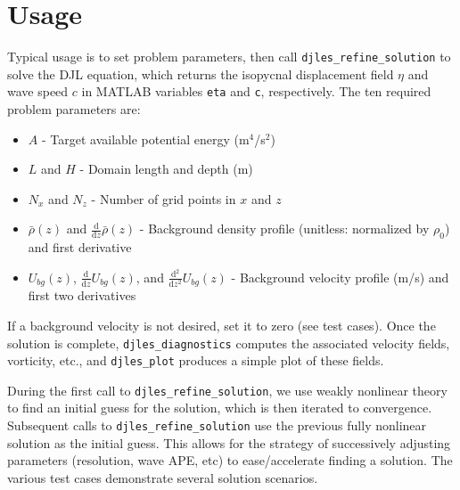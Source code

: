 \documentclass[letterpaper]{article}
\newcommand{\deriv}[2]{\frac{\mathrm{d}#1}{\mathrm{d}#2}}
\begin{document}
\section{Usage}
Typical usage is to set problem parameters, then call \verb+djles_refine_solution+ to solve the DJL equation, which returns the isopycnal displacement field $\eta$ and wave speed $c$ in MATLAB variables \verb+eta+ and \verb+c+, respectively. The ten required problem parameters are:
\begin{itemize}
 \item $A$ - Target available potential energy (m$^4$/s$^2$)
 \item $L$ and $H$ - Domain length and depth (m)
 \item $N_x$ and $N_z$ - Number of grid points in $x$ and $z$
 \item $\bar{\rho}(z)$ and $\deriv{}{z} \bar{\rho}(z)$
       - Background density profile (unitless: normalized by $\rho_0$) and first derivative
  \item $U_{bg}(z)$, $\deriv{}{z} U_{bg}(z)$, and $\deriv{^2}{z^2} U_{bg}(z)$
       - Background velocity profile (m/s) and first two derivatives
\end{itemize}
If a background velocity is not desired, set it to zero (see test cases). 
Once the solution is complete, \verb+djles_diagnostics+ computes the associated velocity fields, vorticity, etc., and \verb+djles_plot+ produces a simple plot of these fields.

During the first call to \verb+djles_refine_solution+, we use weakly nonlinear theory to find an initial guess for the solution, which is then iterated to convergence. Subsequent calls to \verb+djles_refine_solution+ use the previous fully nonlinear solution as the initial guess. This allows for the strategy of successively adjusting parameters (resolution, wave APE, etc) to ease/accelerate finding a solution. The various test cases demonstrate several solution scenarios.
\end{document}

